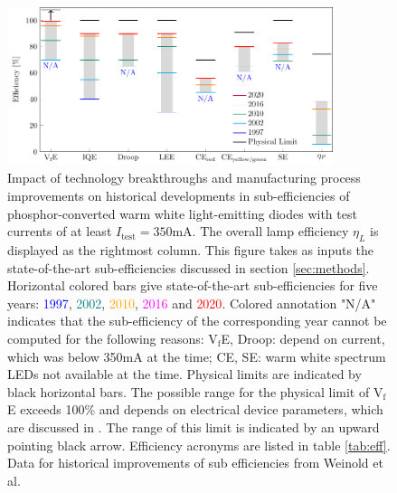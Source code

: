 \documentclass[a4paper,nocompress]{spie}  %
\begin{document}
\clearpage
\begin{figure} [ht]
    \begin{center}
        \includegraphics[width=0.85\textwidth]{SPIE/article/breakthroughs_efficiency.pdf}
    \end{center}
    \caption{Impact of technology breakthroughs and manufacturing process improvements on historical developments in sub-efficiencies of phosphor-converted warm white light-emitting diodes with test currents of at least $I_\text{test}=350$mA. The overall lamp efficiency $\eta_L$ is displayed as the rightmost column. This figure takes as inputs the state-of-the-art sub-efficiencies discussed in section \ref{sec:methods}. Horizontal colored bars give state-of-the-art sub-efficiencies for five years: \textcolor{blue}{1997}, \textcolor{teal}{2002}, \textcolor{orange}{2010}, \textcolor{magenta}{2016} and \textcolor{red}{2020}. Colored annotation "N/A" indicates that the sub-efficiency of the corresponding year cannot be computed for the following reasons: V$_\text{f}$E, Droop: depend on current, which was below 350mA at the time; CE, SE: warm white spectrum LEDs not available at the time. Physical limits are indicated by black horizontal bars. The possible range for the physical limit of V$_\text{f}$E exceeds 100\% and depends on electrical device parameters, which are discussed in \cite{david2016electrical}. The range of this limit is indicated by an upward pointing black arrow. Efficiency acronyms are listed in table \ref{tab:eff}. Data for historical improvements of sub efficiencies from Weinold et al. \cite{weinold2020technology}}
    \label{fig:efficiency}
\end{figure}
\end{document}
